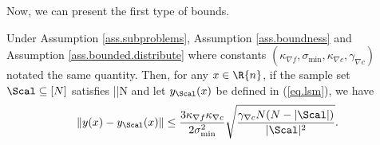 Now, we can present the first type of bounds.
\begin{lemma}
\label{lemma.bound.y.y_p}
Under Assumption \ref{ass.subproblems}, Assumption \ref{ass.boundness} and Assumption \ref{ass.bounded.distribute} where constants $(\kappa_{\nabla f}, \sigma_{\min},\kappa_{\nabla c},\gamma_{\nabla c} )$ notated the same quantity. Then, for any $x\in\R{n}$, if the sample set $\Scal\subseteq[N]$ satisfies 
\bequation\label{ineq.y.y-ys}
|\Scal|\ge{}N 
\eequation
and let $y_\Scal(x)$ be defined in (\ref{eq.lsm}), we have
 	\[
 	\|y(x)-y_\Scal(x)\|\le \frac{3\kappa_{\nabla f}\kappa_{\nabla c}}{2\sigma_{\min}^2}\sqrt{ \frac{\gamma_{\nabla c} N(N-|\Scal|)}{|\Scal|^2}}.
 	\]
 \end{lemma}
 
